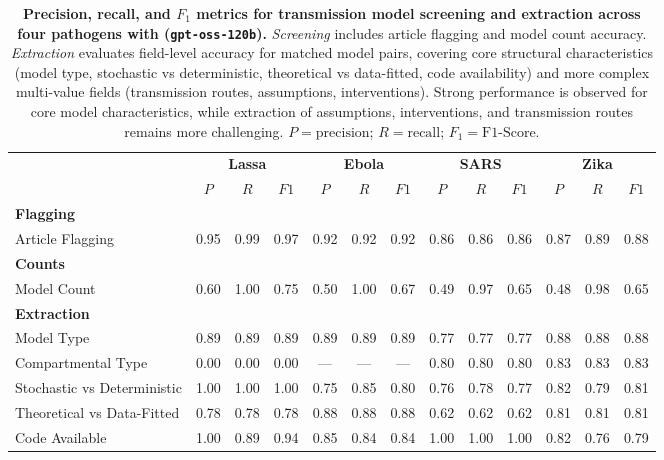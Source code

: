 \begin{table}[b!]
\setlength{\tabcolsep}{3pt}
\centering
\caption{\textbf{Precision, recall, and $F_1$ metrics for transmission model screening and extraction across four pathogens with \name{} (\texttt{gpt-oss-120b}).} \textit{Screening} includes article flagging and model count accuracy. \textit{Extraction} evaluates field-level accuracy for matched model pairs, covering core structural characteristics (model type, stochastic vs deterministic, theoretical vs data-fitted, code availability) and more complex multi-value fields (transmission routes, assumptions, interventions). Strong performance is observed for core model characteristics, while extraction of assumptions, interventions, and transmission routes remains more challenging. $P=\text{precision}$; $R=\text{recall}$; $F_1=\text{F1-Score}$.}
\label{tab:models_detailed_metrics}
\renewcommand{\arraystretch}{1}
{\footnotesize
\begin{tabular}{l|cccccccccccc}
\toprule
 & \multicolumn{3}{c}{\textbf{Lassa}} & \multicolumn{3}{c}{\textbf{Ebola}} & \multicolumn{3}{c}{\textbf{SARS}} & \multicolumn{3}{c}{\textbf{Zika}} \\
 & $P$ & $R$ & $F1$ & $P$ & $R$ & $F1$ & $P$ & $R$ & $F1$ & $P$ & $R$ & $F1$ \\
\midrule
\multicolumn{13}{l}{\textbf{Flagging}} \\
Article Flagging
& 0.95 & 0.99 & 0.97
& 0.92 & 0.92 & 0.92
& 0.86 & 0.86 & 0.86
& 0.87 & 0.89 & 0.88 \\
\midrule
\multicolumn{13}{l}{\textbf{Counts}} \\
Model Count
& 0.60 & 1.00 & 0.75
& 0.50 & 1.00 & 0.67
& 0.49 & 0.97 & 0.65
& 0.48 & 0.98 & 0.65 \\
\midrule
\multicolumn{13}{l}{\textbf{Extraction}} \\
Model Type
& 0.89 & 0.89 & 0.89
& 0.89 & 0.89 & 0.89
& 0.77 & 0.77 & 0.77
& 0.88 & 0.88 & 0.88 \\
\midrule
Compartmental Type
& 0.00 & 0.00 & 0.00
& --- & --- & ---
& 0.80 & 0.80 & 0.80
& 0.83 & 0.83 & 0.83 \\
\midrule
Stochastic vs Deterministic
& 1.00 & 1.00 & 1.00
& 0.75 & 0.85 & 0.80
& 0.76 & 0.78 & 0.77
& 0.82 & 0.79 & 0.81 \\
\midrule
Theoretical vs Data-Fitted
& 0.78 & 0.78 & 0.78
& 0.88 & 0.88 & 0.88
& 0.62 & 0.62 & 0.62
& 0.81 & 0.81 & 0.81 \\
\midrule
Code Available
& 1.00 & 0.89 & 0.94
& 0.85 & 0.84 & 0.84
& 1.00 & 1.00 & 1.00
& 0.82 & 0.76 & 0.79 \\

\end{tabular}}
\end{table}
